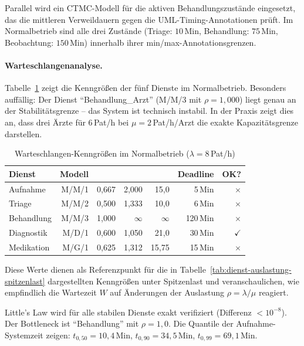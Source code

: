 ﻿\documentclass[a4paper,12pt]{report}
\theoremstyle{definition}
\begin{document}
Parallel wird ein CTMC-Modell für die aktiven Behandlungszustände
eingesetzt, das die mittleren Verweildauern gegen die UML-Timing-Annotationen
prüft. Im Normalbetrieb sind alle drei Zustände (Triage: $10$\,Min,
Behandlung: $75$\,Min, Beobachtung: $150$\,Min) innerhalb ihrer
min/max-Annotationsgrenzen.

\paragraph{Warteschlangenanalyse.}
Tabelle~\ref{tab:wq-normal} zeigt die Kenngrößen der fünf Dienste im
Normalbetrieb. Besonders auffällig: Der Dienst ``Behandlung\_Arzt'' (M/M/3
mit $\rho = 1{,}000$) liegt genau an der Stabilitätsgrenze -- das System
ist technisch instabil. In der Praxis zeigt dies an, dass drei Ärzte
für $6$\,Pat/h bei $\mu = 2$\,Pat/h/Arzt die exakte Kapazitätsgrenze darstellen.

\begin{table}[H]
	\centering
	\begin{tabular}{@{}lrrrrrr@{}}
		\toprule
		\textbf{Dienst} & \textbf{Modell} & \boldmath{$\rho$} &
		\boldmath{$L$} & \boldmath{$W$\,(Min)} & \textbf{Deadline} & \textbf{OK?} \\
		\midrule
		Aufnahme        & M/M/1   & 0{,}667 & 2{,}000 &  15{,}0 & 5\,Min  & $\times$ \\
		Triage          & M/M/2   & 0{,}500 & 1{,}333 &  10{,}0 & 6\,Min  & $\times$ \\
		Behandlung      & M/M/3   & 1{,}000 & $\infty$& $\infty$& 120\,Min& $\times$ \\
		Diagnostik      & M/D/1   & 0{,}600 & 1{,}050 &  21{,}0 & 30\,Min & $\checkmark$ \\
		Medikation      & M/G/1   & 0{,}625 & 1{,}312 &  15{,}75& 15\,Min & $\times$ \\
		\bottomrule
	\end{tabular}
	\caption{Warteschlangen-Kenngrößen im Normalbetrieb ($\lambda=8$\,Pat/h)}
\label{tab:queue-normal}
	\label{tab:wq-normal}
\end{table}

Diese Werte dienen als Referenzpunkt für die in Tabelle~\ref{tab:dienst-auslastung-spitzenlast} dargestellten Kenngrößen unter Spitzenlast und veranschaulichen, wie empfindlich die Wartezeit $W$ auf Änderungen der Auslastung $\rho = \lambda/\mu$ reagiert.

Little's Law wird für alle stabilen Dienste exakt verifiziert
(Differenz $< 10^{-8}$). Der Bottleneck ist ``Behandlung'' mit $\rho = 1{,}0$.
Die Quantile der Aufnahme-Systemzeit zeigen:
$t_{0{,}50} = 10{,}4$\,Min, $t_{0{,}90} = 34{,}5$\,Min, $t_{0{,}99} = 69{,}1$\,Min.
\end{document}
